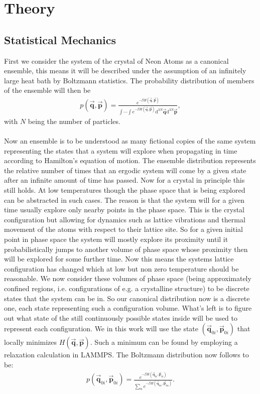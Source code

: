 \chapter{Theory}
\label{chap:Theory}
%
\section{Statistical Mechanics}
First we consider the system of the crystal of Neon Atoms as a canonical ensemble, this means it will be described under the assumption of an infinitely large heat bath by Boltzmann statistics. The probability distribution of members of the ensemble will then be 
\begin{align}
	p(\vec{\mathbf{q}},\vec{\mathbf{p}})=\frac{e^{-\beta H(\vec{\mathbf{q}},\vec{\mathbf{p}})}}{\int\cdots\int e^{-\beta H(\vec{\mathbf{q}},\vec{\mathbf{p}})}\mathrm{d}^{3N}\vec{\mathbf{q}}\mathrm{d}^{3N}\vec{\mathbf{p}}},
\end{align}
with $N$ being the number of particles.\\\\
Now an ensemble is to be understood as many fictional copies of the same system representing the states that a system will explore when propagating in time according to Hamilton's equation of motion. The ensemble distribution represents the relative number of times that an ergodic system will come by a given state after an infinite amount of time has passed. Now for a crystal in principle this still holds. At low temperatures though the phase space that is being explored can be abstracted in such cases. The reason is that the system will for a given time usually explore only nearby points in the phase space. This is the crystal configuration but allowing for dynamics such as lattice vibrations and thermal movement of the atoms with respect to their lattice site. So for a given initial point in phase space the system will mostly explore its proximity until it probabilistically jumps to another volume of phase space whose proximity then will be explored for some further time. Now this means the systems lattice configuration has changed which at low but non zero temperature should be reasonable. 
We now consider these volumes of phase space (being approximately confined regions, i.e. configurations of e.g. a crystalline structure) to be discrete states that the system can be in. So our canonical distribution now is a discrete one, each state representing such a configuration volume. What's left is to figure out what state of the still continuously possible states inside will be used to represent each configuration. We in this work will use the state $(\vec{\mathbf{q}}_{0i},\vec{\mathbf{p}}_{0i})$ that locally minimizes $H(\vec{\mathbf{q}},\vec{\mathbf{p}})$. Such a minimum can be found by employing a relaxation calculation in LAMMPS. The Boltzmann distribution now follows to be:
\begin{align}
	p(\vec{\mathbf{q}}_{0i},\vec{\mathbf{p}}_{0i})=\frac{e^{-\beta H(\vec{\mathbf{q}}_{0i},\vec{\mathbf{p}}_{0i})}}{\sum_{n} e^{-\beta H(\vec{\mathbf{q}}_{0n},\vec{\mathbf{p}}_{0n})}}.
\end{align}


